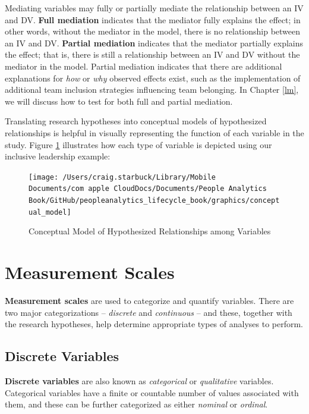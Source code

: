 \documentclass[]{book}
\begin{document}
Mediating variables may fully or partially mediate the relationship between an IV and DV. \textbf{Full mediation} indicates that the mediator fully explains the effect; in other words, without the mediator in the model, there is no relationship between an IV and DV. \textbf{Partial mediation} indicates that the mediator partially explains the effect; that is, there is still a relationship between an IV and DV without the mediator in the model. Partial mediation indicates that there are additional explanations for \emph{how} or \emph{why} observed effects exist, such as the implementation of additional team inclusion strategies influencing team belonging. In Chapter \ref{lm}, we will discuss how to test for both full and partial mediation.

Translating research hypotheses into conceptual models of hypothesized relationships is helpful in visually representing the function of each variable in the study. Figure \ref{fig:concept-mdl} illustrates how each type of variable is depicted using our inclusive leadership example:

\begin{figure}

{\centering \texttt{[image: /Users/craig.starbuck/Library/Mobile Documents/com~apple~CloudDocs/Documents/People Analytics Book/GitHub/peopleanalytics\_lifecycle\_book/graphics/conceptual\_model]} 

}

\caption{Conceptual Model of Hypothesized Relationships among Variables}\label{fig:concept-mdl}
\end{figure}

\hypertarget{measurement-scales}{%
\section{Measurement Scales}\label{measurement-scales}}

\textbf{Measurement scales} are used to categorize and quantify variables. There are two major categorizations -- \emph{discrete} and \emph{continuous} -- and these, together with the research hypotheses, help determine appropriate types of analyses to perform.

\hypertarget{discrete-variables}{%
\subsection{Discrete Variables}\label{discrete-variables}}

\textbf{Discrete variables} are also known as \emph{categorical} or \emph{qualitative} variables. Categorical variables have a finite or countable number of values associated with them, and these can be further categorized as either \emph{nominal} or \emph{ordinal}.
\end{document}
